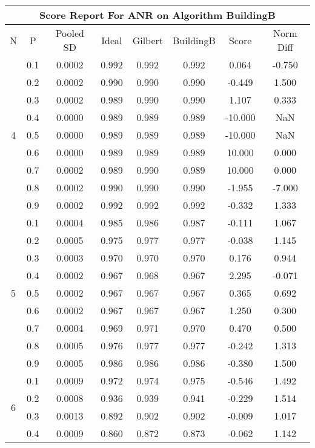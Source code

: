 \documentclass[11pt,a4paper]{report}
\begin{document}
\begin{longtable}{ | c | c || c | c | c | c | c | c | }
\hline
\multicolumn{8}{|c|}{ Score Report For ANR on Algorithm BuildingB} \\
\hline
N & P & Pooled SD &  Ideal &  Gilbert & BuildingB  & Score & Norm Diff \\
 \hline
 \hline
 \endhead
\multirow{9}{*}{4} & 0.1 & 0.0002 & 0.992 & 0.992 & 0.992 & 0.064 & -0.750 \\
 & 0.2 & 0.0002 & 0.990 & 0.990 & 0.990 & -0.449 & 1.500 \\
 & 0.3 & 0.0002 & 0.989 & 0.990 & 0.990 & 1.107 & 0.333 \\
 & 0.4 & 0.0000 & 0.989 & 0.989 & 0.989 & -10.000 & NaN \\
 & 0.5 & 0.0000 & 0.989 & 0.989 & 0.989 & -10.000 & NaN \\
 & 0.6 & 0.0000 & 0.989 & 0.989 & 0.989 & 10.000 & 0.000 \\
 & 0.7 & 0.0002 & 0.989 & 0.990 & 0.989 & 10.000 & 0.000 \\
 & 0.8 & 0.0002 & 0.990 & 0.990 & 0.990 & -1.955 & -7.000 \\
 & 0.9 & 0.0002 & 0.992 & 0.992 & 0.992 & -0.332 & 1.333 \\
 \hline
\multirow{9}{*}{5} & 0.1 & 0.0004 & 0.985 & 0.986 & 0.987 & -0.111 & 1.067 \\
 & 0.2 & 0.0005 & 0.975 & 0.977 & 0.977 & -0.038 & 1.145 \\
 & 0.3 & 0.0003 & 0.970 & 0.970 & 0.970 & 0.176 & 0.944 \\
 & 0.4 & 0.0002 & 0.967 & 0.968 & 0.967 & 2.295 & -0.071 \\
 & 0.5 & 0.0002 & 0.967 & 0.967 & 0.967 & 0.365 & 0.692 \\
 & 0.6 & 0.0002 & 0.967 & 0.967 & 0.967 & 1.250 & 0.300 \\
 & 0.7 & 0.0004 & 0.969 & 0.971 & 0.970 & 0.470 & 0.500 \\
 & 0.8 & 0.0005 & 0.976 & 0.977 & 0.977 & -0.242 & 1.313 \\
 & 0.9 & 0.0005 & 0.986 & 0.986 & 0.986 & -0.380 & 1.500 \\
 \hline
\multirow{9}{*}{6} & 0.1 & 0.0009 & 0.972 & 0.974 & 0.975 & -0.546 & 1.492 \\
 & 0.2 & 0.0008 & 0.936 & 0.939 & 0.941 & -0.229 & 1.514 \\
 & 0.3 & 0.0013 & 0.892 & 0.902 & 0.902 & -0.009 & 1.017 \\
 & 0.4 & 0.0009 & 0.860 & 0.872 & 0.873 & -0.062 & 1.142 \\

\end{longtable}
\end{document}
